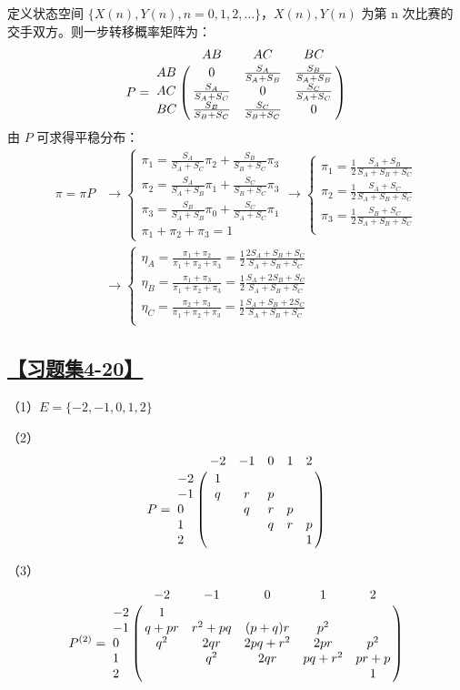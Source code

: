 定义状态空间 $\{X(n),Y(n), n=0, 1, 2, \dots\}$，$X(n),Y(n)$ 为第 n 次比赛的交手双方。则一步转移概率矩阵为：
$$
P=\bordermatrix{
	~ & AB & AC & BC \cr
	AB & 0 & \frac{S_A}{S_A+S_B} & \frac{S_B}{S_A+S_B} \cr
	AC & \frac{S_A}{S_A+S_C} & 0 & \frac{S_C}{S_A+S_C} \cr
	BC & \frac{S_B}{S_B+S_C} & \frac{S_C}{S_B+S_C} & 0 \cr
}
$$
由 $P$ 可求得平稳分布：
\begin{equation}
\begin{split}
\pi=\pi P &\rightarrow
\begin{cases}
\pi_1 = \frac{S_A}{S_A+S_C}\pi_2 + \frac{S_B}{S_B+S_C}\pi_3 \\
\pi_2 = \frac{S_A}{S_A+S_B}\pi_1 + \frac{S_C}{S_B+S_C}\pi_3 \\
\pi_3 = \frac{S_B}{S_A+S_B}\pi_0 + \frac{S_C}{S_A+S_C}\pi_1 \\
\pi_1+\pi_2+\pi_3 = 1
\end{cases}
\rightarrow
\begin{cases}
\pi_1 = \frac{1}{2}\frac{S_A+S_B}{S_A+S_B+S_C}\\
\pi_2 = \frac{1}{2}\frac{S_A+S_C}{S_A+S_B+S_C}\\
\pi_3 = \frac{1}{2}\frac{S_B+S_C}{S_A+S_B+S_C}\\
\end{cases}
\\
& \rightarrow
\begin{cases}
\eta_A = \frac{\pi_1+\pi_2}{\pi_1+\pi_2+\pi_3} = \frac{1}{2}\frac{2S_A+S_B+S_C}{S_A+S_B+S_C}\\
\eta_B = \frac{\pi_1+\pi_3}{\pi_1+\pi_2+\pi_3} = \frac{1}{2}\frac{S_A+2S_B+S_C}{S_A+S_B+S_C}\\
\eta_C = \frac{\pi_2+\pi_3}{\pi_1+\pi_2+\pi_3} = \frac{1}{2}\frac{S_A+S_B+2S_C}{S_A+S_B+S_C}\\
\end{cases}
\end{split}
\tag*{}
\end{equation}

\subsection{\hyperref[Q4-20]{【习题集4-20】}}\label{A4-20}

（1）$E=\{-2, -1, 0, 1, 2\}$

（2）
$$
P=\bordermatrix{
	~ & -2 & -1 & 0 & 1 & 2 \cr
	-2 & 1 & \cr
	-1 & q & r & p \cr
	0 & & q & r & p & \cr
	1 & & & q & r & p \cr
	2 & & & & & 1\cr
}
$$

（3）
$$
P^{(2)}=\bordermatrix{
	~ & -2 & -1 & 0 & 1 & 2 \cr
	-2 & 1 & \cr
	-1 & q+pr & r^2+pq & (p+q)r & p^2\cr
	0 & q^2 & 2qr & 2pq+r^2 & 2pr & p^2\cr
	1 & & q^2 & 2qr & pq+r^2 & pr+p \cr
	2 & & & & & 1\cr
}
$$

